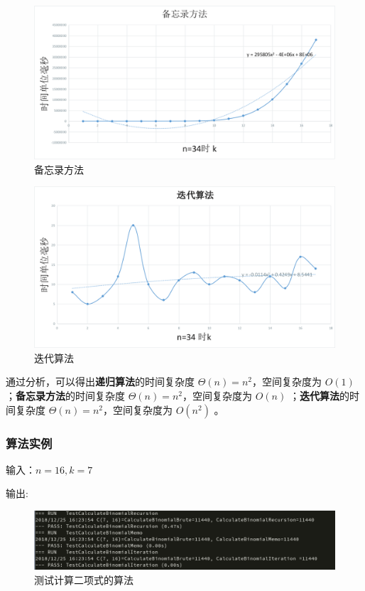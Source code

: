 \documentclass{ctexart}
\begin{document}
\begin{figure}[H]
	\centering
	\includegraphics[scale=0.5]{../images/memo.png}
	\caption{备忘录方法}
\end{figure}

\begin{figure}[H]
	\centering
	\includegraphics[scale=0.4]{../images/iteration.png}
	\caption{迭代算法}
\end{figure}

通过分析，可以得出{\bfseries 递归算法}的时间复杂度 $\Theta(n) = n^2$，空间复杂度为 $O(1)$ ；{\bfseries 备忘录方法}的时间复杂度 $\Theta(n) = n^2，$空间复杂度为 $O(n)$ ；{\bfseries 迭代算法}的时间复杂度 $\Theta(n) = n^2$，空间复杂度为 $O(n^2)$ 。
\subsubsection{算法实例}
输入：$n=16, k=7$ 

输出:

\begin{figure}[H]
	\centering
	\includegraphics[scale=0.5]{../images/binomial-test.png}
	\caption{测试计算二项式的算法}
\end{figure}
\end{document}
